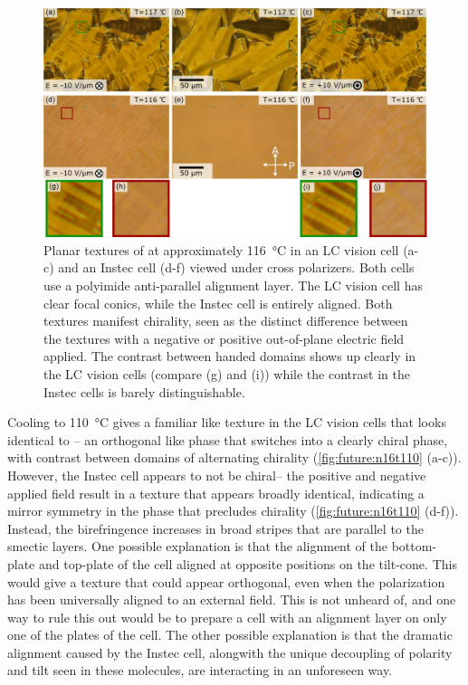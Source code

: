 \documentclass[aagreenthesis]{subfiles}
\begin{document}
\begin{figure}[h!]
    \centering
    \includegraphics[width=\textwidth]{figs/pal30/future/LCvIn116.png}
    \caption{\label{fig:future:n16t116} Planar textures of \nsix{} at approximately
        \SI{116}{\degreeCelsius} in an LC vision cell
    (a-c) and an Instec cell (d-f) viewed under cross polarizers. Both cells use a polyimide anti-parallel
alignment layer. The LC vision cell has clear focal conics, while the Instec
cell is entirely aligned. Both textures manifest chirality, seen as the distinct
difference between the textures with a negative or positive out-of-plane
electric field applied. The contrast between handed domains shows up clearly in
the LC vision cells (compare (g) and (i)) while the contrast in the Instec cells
is barely distinguishable. }
\end{figure}


Cooling to \SI{110}{\degreeCelsius}  gives a familiar \smcapa{} like texture in
the LC vision cells that looks identical to \nfour{}-- an orthogonal like phase
that switches into a clearly chiral phase, with contrast between domains of
alternating chirality (\autoref{fig:future:n16t110} (a-c)). However, the Instec cell appears to not be chiral-- the
positive and negative applied field result in a texture that appears broadly
identical, indicating a mirror symmetry in the phase that precludes
chirality (\autoref{fig:future:n16t110} (d-f)). Instead, the birefringence
increases in broad stripes that are parallel to the smectic layers. One possible
explanation is that the alignment of the bottom-plate and top-plate of the cell
aligned at opposite positions on the tilt-cone. This would give a texture that
could appear orthogonal, even when the polarization has been universally aligned
to an external field. This is not unheard of, and one way to rule this out would
be to prepare a cell with an alignment layer on only one of the plates of the
cell. The other possible explanation is that the dramatic alignment caused by
the Instec cell, alongwith the unique decoupling of polarity and tilt seen in
these molecules, are interacting in an unforeseen way. 
\end{document}
